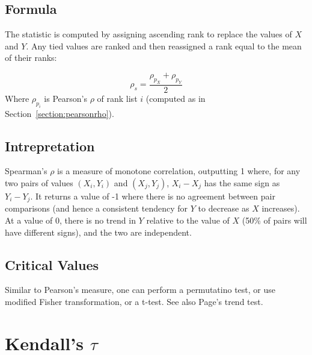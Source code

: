 \documentclass[11pt]{article}
\begin{document}
\subsection{Formula}
The statistic is computed by assigning ascending rank to replace the values of $X$ and $Y$.  Any tied values are ranked and then reassigned a rank equal to the mean of their ranks: 

$$
\rho_s = \frac{\rho_{p_X} + \rho_{p_Y}}{2}
$$
Where $\rho_{p_i}$ is Pearson's $\rho$ of rank list $i$ (computed as in Section~\ref{section:pearsonrho}).


\subsection{Intrepretation}
Spearman's $\rho$ is a measure of monotone correlation, outputting 1 where, for any two pairs of values $(X_i, Y_i)$ and $(X_j, Y_j)$, $X_i - X_j$ has the same sign as $Y_i - Y_j$.  It returns a value of -1 where there is no agreement between pair comparisons (and hence a consistent tendency for $Y$ to decrease as $X$ increases).  At a value of 0, there is no trend in $Y$ relative to the value of $X$ (50\% of pairs will have different signs), and the two are independent.

\subsection{Critical Values}
Similar to Pearson's measure, one can perform a permutatino test, or use modified Fisher transformation, or a t-test.  See also Page's trend test.









\section{Kendall's $\tau$} %
\label{section:kendalltau}
\end{document}
